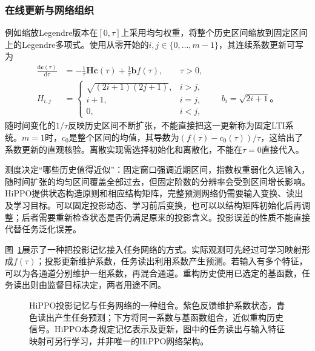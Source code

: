 \subsubsection{在线更新与网络组织}
\label{sec:rnn-hippo-architecture}

例如缩放Legendre版本在$[0,\tau]$上采用均匀权重，将整个历史区间缩放到固定区间上的Legendre多项式。使用从零开始的$i,j\in\{0,\ldots,m-1\}$，其连续系数更新可写为
\begin{equation}
  \begin{aligned}
    \frac{\mathrm{d}\bm{c}(\tau)}{\mathrm{d}\tau}
      &=-\frac{1}{\tau}\bm{H}\bm{c}(\tau)
        +\frac{1}{\tau}\bm{b}f(\tau),\qquad \tau>0,\\
    H_{i,j}&=
      \begin{cases}
        \sqrt{(2i+1)(2j+1)},&i>j,\\
        i+1,&i=j,\\
        0,&i<j,
      \end{cases}
      \qquad b_i=\sqrt{2i+1}\text{。}
  \end{aligned}
  \label{eq:rnn-hippo-legs}
\end{equation}
随时间变化的$1/\tau$反映历史区间不断扩张，不能直接把这一更新称为固定LTI系统。$m=1$时，$c_0$是整个区间的均值，其导数为$(f(\tau)-c_0(\tau))/\tau$，这给出了系数更新的直观核验。离散实现需选择初始化和离散化，不能在$\tau=0$直接代入。

测度决定“哪些历史值得近似”：固定窗口强调近期区间，指数权重弱化久远输入，随时间扩张的均匀区间覆盖全部过去，但固定阶数的分辨率会受到区间增长影响。HiPPO提供状态构造原则和相应结构矩阵，完整预测网络仍需要输入变换、读出及学习目标。可以固定投影动态、学习前后变换，也可以以结构矩阵初始化后再调整；后者需要重新检查状态是否仍满足原来的投影含义。投影误差的性质不能直接代替任务泛化误差。


图~\ref{fig:rnn-hippo}展示了一种把投影记忆接入任务网络的方式。实际观测可先经过可学习映射形成$f(\tau)$；投影更新维护系数，任务读出利用系数产生预测。若输入有多个特征，可以为各通道分别维护一组系数，再混合通道。重构历史使用已选定的基函数，任务读出则由监督目标决定，两者用途不同。
\begin{figure}[htb]
  \centering
  
  \caption{HiPPO投影记忆与任务网络的一种组合。紫色反馈维护系数状态，青色读出产生任务预测；下方将同一系数与基函数组合，近似重构历史信号。HiPPO本身规定记忆表示及更新，图中的任务读出与输入特征映射可另行学习，并非唯一的HiPPO网络架构。}
  \label{fig:rnn-hippo}
\end{figure}

